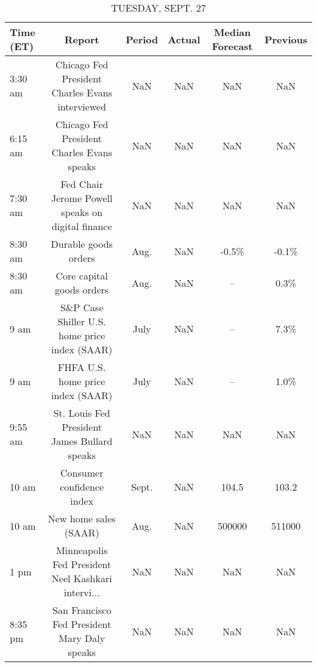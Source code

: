 \documentclass{article}%
\begin{document}
\begin{table}[htbp]%
\caption{TUESDAY, SEPT. 27}%
\centering%
\begin{adjustbox}{width=1\textwidth}%
\begin{tabular}{lccccc}
\toprule
Time (ET) &                                             Report & Period & Actual & Median Forecast & Previous \\
\midrule
  3:30 am &    Chicago Fed President Charles Evans interviewed &    NaN &    NaN &             NaN &      NaN \\
  6:15 am &         Chicago Fed President Charles Evans speaks &    NaN &    NaN &             NaN &      NaN \\
  7:30 am &  Fed Chair Jerome Powell speaks on digital finance &    NaN &    NaN &             NaN &      NaN \\
  8:30 am &                               Durable goods orders &   Aug. &    NaN &           -0.5\% &    -0.1\% \\
  8:30 am &                          Core capital goods orders &   Aug. &    NaN &              -- &     0.3\% \\
     9 am &      S\&P Case Shiller U.S. home price index (SAAR) &   July &    NaN &              -- &     7.3\% \\
     9 am &                  FHFA U.S. home price index (SAAR) &   July &    NaN &              -- &     1.0\% \\
  9:55 am &       St. Louis Fed President James Bullard speaks &    NaN &    NaN &             NaN &      NaN \\
    10 am &                          Consumer confidence index &  Sept. &    NaN &           104.5 &    103.2 \\
    10 am &                              New home sales (SAAR) &   Aug. &    NaN &          500000 &   511000 \\
     1 pm & Minneapolis Fed President Neel Kashkari intervi... &    NaN &    NaN &             NaN &      NaN \\
  8:35 pm &       San Francisco Fed President Mary Daly speaks &    NaN &    NaN &             NaN &      NaN \\
\bottomrule
\end{tabular}
%
\end{adjustbox}%
\end{table}

%
\end{document}
